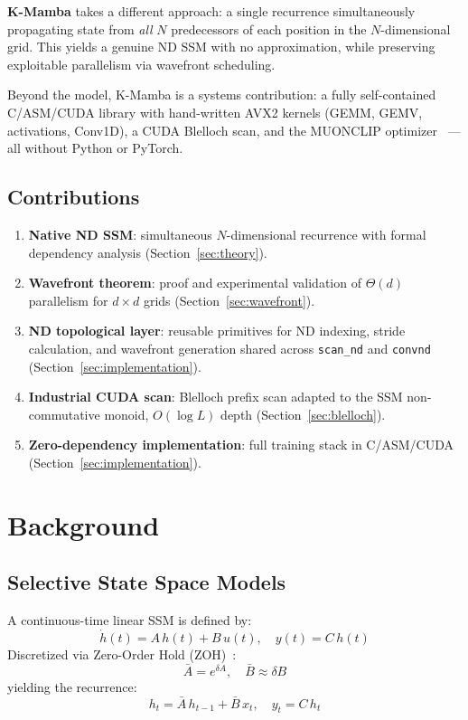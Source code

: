\documentclass[10pt,onecolumn]{article}
\begin{document}
\textbf{K-Mamba} takes a different approach: a single recurrence
simultaneously propagating state from \emph{all} $N$ predecessors of each
position in the $N$-dimensional grid.
This yields a genuine ND SSM with no approximation, while preserving
exploitable parallelism via wavefront scheduling.

Beyond the model, K-Mamba is a systems contribution:
a fully self-contained C/ASM/CUDA library with hand-written
AVX2 kernels (GEMM, GEMV, activations, Conv1D), a CUDA Blelloch scan,
and the MUONCLIP optimizer~\cite{muon2025} — all without Python or PyTorch.

\subsection*{Contributions}

\begin{enumerate}
  \item \textbf{Native ND SSM}: simultaneous $N$-dimensional recurrence
        with formal dependency analysis (Section~\ref{sec:theory}).
  \item \textbf{Wavefront theorem}: proof and experimental validation of
        $\Theta(d)$ parallelism for $d \times d$ grids (Section~\ref{sec:wavefront}).
  \item \textbf{ND topological layer}: reusable primitives for ND indexing,
        stride calculation, and wavefront generation shared across
        \texttt{scan\_nd} and \texttt{convnd} (Section~\ref{sec:implementation}).
  \item \textbf{Industrial CUDA scan}: Blelloch prefix scan adapted
        to the SSM non-commutative monoid, $O(\log L)$ depth
        (Section~\ref{sec:blelloch}).
  \item \textbf{Zero-dependency implementation}: full training stack
        in C/ASM/CUDA (Section~\ref{sec:implementation}).
\end{enumerate}

\section{Background}

\subsection{Selective State Space Models}

A continuous-time linear SSM is defined by:
\begin{equation}
  \dot{h}(t) = A\,h(t) + B\,u(t), \quad y(t) = C\,h(t)
\end{equation}
Discretized via Zero-Order Hold (ZOH)~\cite{s4}:
\begin{equation}
  \bar{A} = e^{\delta A}, \quad
  \bar{B} \approx \delta B
\end{equation}
yielding the recurrence:
\begin{equation}
  h_t = \bar{A}\,h_{t-1} + \bar{B}\,x_t, \quad y_t = C\,h_t
\end{equation}
\end{document}
